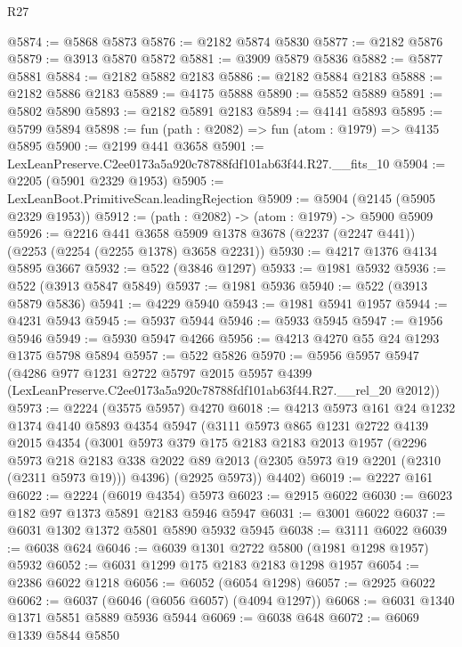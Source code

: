 \begin{lexlean}{R27}
\begin{coremodule}
@5874 := @5868 @5873
@5876 := @2182 @5874 @5830
@5877 := @2182 @5876
@5879 := @3913 @5870 @5872
@5881 := @3909 @5879 @5836
@5882 := @5877 @5881
@5884 := @2182 @5882 @2183
@5886 := @2182 @5884 @2183
@5888 := @2182 @5886 @2183
@5889 := @4175 @5888
@5890 := @5852 @5889
@5891 := @5802 @5890
@5893 := @2182 @5891 @2183
@5894 := @4141 @5893
@5895 := @5799 @5894
@5898 := fun (path : @2082) => fun (atom : @1979) => @4135 @5895
@5900 := @2199 @441 @3658
@5901 := LexLeanPreserve.C2ee0173a5a920c78788fdf101ab63f44.R27.__fits_10
@5904 := @2205 (@5901 @2329 @1953)
@5905 := LexLeanBoot.PrimitiveScan.leadingRejection
@5909 := @5904 (@2145 (@5905 @2329 @1953))
@5912 := (path : @2082) -> (atom : @1979) -> @5900 @5909
@5926 := @2216
    @441
    @3658
    @5909
    @1378
    @3678
    (@2237 (@2247 @441))
    (@2253 (@2254 (@2255 @1378) @3658 @2231))
@5930 := @4217 @1376 @4134 @5895 @3667
@5932 := @522 (@3846 @1297)
@5933 := @1981 @5932
@5936 := @522 (@3913 @5847 @5849)
@5937 := @1981 @5936
@5940 := @522 (@3913 @5879 @5836)
@5941 := @4229 @5940
@5943 := @1981 @5941 @1957
@5944 := @4231 @5943
@5945 := @5937 @5944
@5946 := @5933 @5945
@5947 := @1956 @5946
@5949 := @5930 @5947 @4266
@5956 := @4213 @4270 @55 @24 @1293 @1375 @5798 @5894
@5957 := @522 @5826
@5970 := @5956
    @5957
    @5947
    (@4286
      @977
      @1231
      @2722
      @5797
      @2015
      @5957
      @4399
      (LexLeanPreserve.C2ee0173a5a920c78788fdf101ab63f44.R27.__rel_20 @2012))
@5973 := @2224 (@3575 @5957) @4270
@6018 := @4213
    @5973
    @161
    @24
    @1232
    @1374
    @4140
    @5893
    @4354
    @5947
    (@3111
      @5973
      @865
      @1231
      @2722
      @4139
      @2015
      @4354
      (@3001
        @5973
        @379
        @175
        @2183
        @2183
        @2013
        @1957
        (@2296
          @5973
          @218
          @2183
          @338
          @2022
          @89
          @2013
          (@2305 @5973 @19 @2201 (@2310 (@2311 @5973 @19)))
          @4396)
        (@2925 @5973))
      @4402)
@6019 := @2227 @161
@6022 := @2224 (@6019 @4354) @5973
@6023 := @2915 @6022
@6030 := @6023 @182 @97 @1373 @5891 @2183 @5946 @5947
@6031 := @3001 @6022
@6037 := @6031 @1302 @1372 @5801 @5890 @5932 @5945
@6038 := @3111 @6022
@6039 := @6038 @624
@6046 := @6039 @1301 @2722 @5800 (@1981 @1298 @1957) @5932
@6052 := @6031 @1299 @175 @2183 @2183 @1298 @1957
@6054 := @2386 @6022 @1218
@6056 := @6052 (@6054 @1298)
@6057 := @2925 @6022
@6062 := @6037 (@6046 (@6056 @6057) (@4094 @1297))
@6068 := @6031 @1340 @1371 @5851 @5889 @5936 @5944
@6069 := @6038 @648
@6072 := @6069 @1339 @5844 @5850

\end{coremodule}
\end{lexlean}
